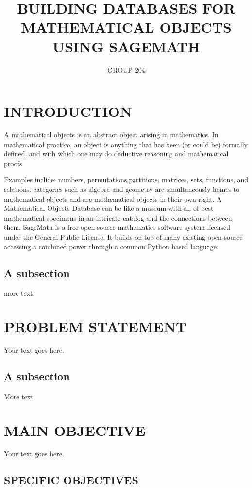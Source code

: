 \documentclass[11pt]{article} %
\title{BUILDING DATABASES FOR MATHEMATICAL OBJECTS USING SAGEMATH}
\author{GROUP 204}
\begin{document}
\maketitle

\section{INTRODUCTION}
A mathematical objects is an abstract object arising in mathematics.
In mathematical practice, an object is anything that has been (or could be) formally defined, and with which one may do deductive reasoning and mathematical proofs.

Examples inclide: numbers, permutations,partitions, matrices, sets, functions, and relations.
categories such as algebra and geometry are simultaneously homes to mathematical objects and are mathematical objects in their own right.
A Mathematical Objects Database can be like a museum with all of best
mathematical specimens in an intricate catalog and the connections
between them.
SageMath is a free open-source mathematics software
system licensed under the General Public License. It builds on top of
many existing open-source accessing a combined power through a common
Python based language.



\subsection{A subsection}

more text.
\section{PROBLEM STATEMENT}

Your text goes here.

\subsection{A subsection}

More text.

\section{MAIN OBJECTIVE}

Your text goes here.

\subsection{SPECIFIC OBJECTIVES}
\end{document}
